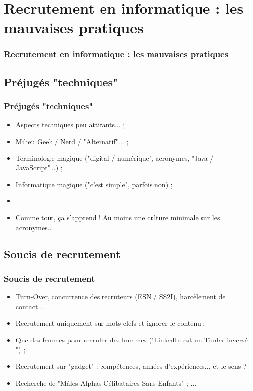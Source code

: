 \documentclass[slidetop,11pt]{beamer}
\begin{document}

\section{Recrutement en informatique : les mauvaises pratiques}
\begin{frame}
	\frametitle{Recrutement en informatique : les mauvaises pratiques}
	\tableofcontents[sections=2,currentsection,subsectionstyle=show/shaded/hide] %
\end{frame}

\subsection{Pr{\'e}jug{\'e}s "techniques"}
\begin{frame}
	\frametitle{Pr{\'e}jug{\'e}s "techniques"}
	\begin{itemize}
		\item Aspects techniques peu attirants... ; 
		\item Milieu Geek / Nerd / "Alternatif"... ; 
		\item Terminologie magique ("digital / num{\'e}rique", acronymes, "Java / JavaScript"...) ; 
		\item Informatique magique ("c'est simple", parfois non) ;  
		\item[] 
		\item Comme tout, \c{c}a s'apprend ! Au moins une culture minimale sur les acronymes... 
	\end{itemize}
\end{frame}

\subsection{Soucis de recrutement}
\begin{frame}
	\frametitle{Soucis de recrutement}
	\begin{itemize}
		\item Turn-Over, concurrence des recruteurs (ESN / SS2I), harc{\`e}lement de contact... 
		\item Recrutement uniquement sur mots-clefs et ignorer le contenu ; 
		\item Que des femmes pour recruter des hommes ("LinkedIn est un Tinder invers{\'e}. ") ; 
		\item Recrutement sur "gadget" : comp{\'e}tences, ann{\'e}es d'exp{\'e}riences... et le sens ?
		\item Recherche de "M{\^a}les Alphas C{\'e}libataires Sans Enfants" ; ...
	\end{itemize}
\end{frame}
\end{document}
